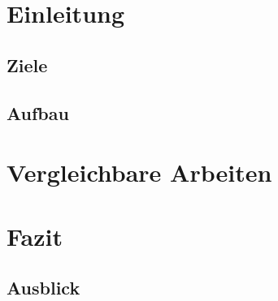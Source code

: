 \begin{abstract}

\keywords{}
\end{abstract}

\section{Einleitung}
\paragraph{}

\subsection{Ziele}

\subsection{Aufbau}

\section{Vergleichbare Arbeiten}
\label{sec:vergleichbare_arbeiten}

\section{Fazit}
\label{sec:fazit}

\subsection{Ausblick}

